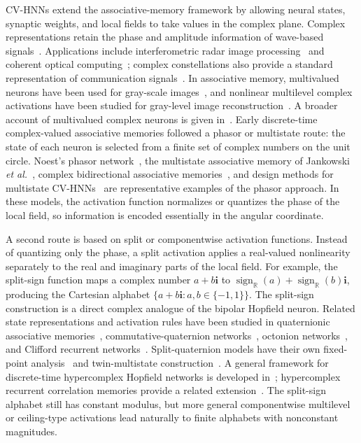 \documentclass[10pt,journal,letterpaper]{IEEEtran}
\begin{document}
CV-HNNs extend the associative-memory framework by allowing neural states, synaptic weights, and local fields to take values in the complex plane. Complex representations retain the phase and amplitude information of wave-based signals~\cite{hirose2009merits}. Applications include interferometric radar image processing~\cite{hirose2001radar} and coherent optical computing~\cite{hirose1994optical}; complex constellations also provide a standard representation of communication signals~\cite{proakis2008}. In associative memory, multivalued neurons have been used for gray-scale images~\cite{aizenberg1992}, and nonlinear multilevel complex activations have been studied for gray-level image reconstruction~\cite{tanaka2009}. A broader account of multivalued complex neurons is given in~\cite{aizenberg2011}. Early discrete-time complex-valued associative memories followed a phasor or multistate route: the state of each neuron is selected from a finite set of complex numbers on the unit circle. Noest's phasor network~\cite{noest1988}, the multistate associative memory of Jankowski \textit{et al.}~\cite{jankowski1996}, complex bidirectional associative memories~\cite{lee1999}, and design methods for multistate CV-HNNs~\cite{muezzinoglu2003} are representative examples of the phasor approach. In these models, the activation function normalizes or quantizes the phase of the local field, so information is encoded essentially in the angular coordinate.

A second route is based on split or componentwise activation functions. Instead of quantizing only the phase, a split activation applies a real-valued nonlinearity separately to the real and imaginary parts of the local field. For example, the split-sign function maps a complex number $a+b\mathbf{i}$ to $\operatorname{sign}_{\mathbb{R}}(a)+\operatorname{sign}_{\mathbb{R}}(b)\mathbf{i}$, producing the Cartesian alphabet $\{a+b\mathbf{i}:a,b\in\{-1,1\}\}$. The split-sign construction is a direct complex analogue of the bipolar Hopfield neuron. Related state representations and activation rules have been studied in quaternionic associative memories~\cite{isokawa2008associative,valle2016quaternionic}, commutative-quaternion networks~\cite{isokawa2010commutative,isokawa2011stabilitycommutative}, octonion networks~\cite{castro2018octonionic,kuroe2016octonion}, and Clifford recurrent networks~\cite{kuroe2011clifford}. Split-quaternion models have their own fixed-point analysis~\cite{kobayashi2017splitquaternion} and twin-multistate construction~\cite{kobayashi2020splittwin}. A general framework for discrete-time hypercomplex Hopfield networks is developed in~\cite{castro2020broad}; hypercomplex recurrent correlation memories provide a related extension~\cite{valle2021hypercomplexrcnn}. The split-sign alphabet still has constant modulus, but more general componentwise multilevel or ceiling-type activations lead naturally to finite alphabets with nonconstant magnitudes.
\end{document}

